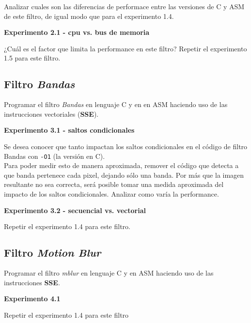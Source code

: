 Analizar cuales son las diferencias de performace entre las versiones de C 
y ASM de este filtro, de igual modo que para el experimento 1.4.

\vspace*{0.3cm} \noindent
\textbf{Experimento 2.1 - cpu vs. bus de memoria}

¿Cuál es el factor que limita la performance en este filtro?
Repetir el experimento 1.5 para este filtro.

\subsection*{Filtro \textit{Bandas}}

Programar el filtro \textit{Bandas} en lenguaje C y en en ASM haciendo uso de 
las instrucciones vectoriales (\textbf{SSE}).

\vspace*{0.3cm} \noindent
\textbf{Experimento 3.1 - saltos condicionales}

Se desea conocer que tanto impactan los saltos condicionales en el código 
de filtro Bandas con \verb|-O1| (la versión en C).\\
Para poder medir esto de manera aproximada, remover el código
que detecta a que banda pertenece cada pixel, dejando
sólo una banda.
Por más que la imagen resultante no sea correcta, será posible tomar una
medida aproximada del impacto de los saltos condicionales.
Analizar como varía la performance. 

\vspace*{0.3cm} \noindent
\textbf{Experimento 3.2 - secuencial vs. vectorial}

Repetir el experimento 1.4 para este filtro.


\subsection*{Filtro \textit{Motion Blur}}
Programar el filtro \textit{mblur} en lenguaje C y en ASM haciendo uso de 
las instrucciones \textbf{SSE}.

\vspace*{0.3cm} \noindent
\textbf{Experimento 4.1}

Repetir el experimento 1.4 para este filtro
